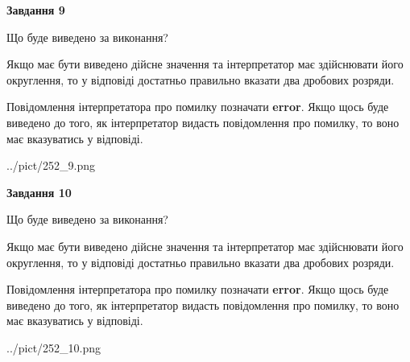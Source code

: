\documentclass[12pt, ukrainian]{article}
\begin{document}
{\begin {Large}
{\begin {center}\textbf{Завдання 9}\end {center}}\par
Що буде виведено за виконання? \par

Якщо має бути виведено дійсне значення та інтерпретатор має здійснювати його округлення, 
то у відповіді достатньо правильно вказати два дробових розряди.

Повідомлення інтерпретатора про помилку позначати \textbf{error}.
Якщо щось буде виведено до того, як інтерпретатор видасть повідомлення про помилку, 
то воно має вказуватись у відповіді. \par

\begin{center}
	{../pict/252_9.png}
\end{center}
\newpage

{\begin {center}\textbf{Завдання 10}\end {center}}\par
Що буде виведено за виконання? \par

Якщо має бути виведено дійсне значення та інтерпретатор має здійснювати його округлення, 
то у відповіді достатньо правильно вказати два дробових розряди.

Повідомлення інтерпретатора про помилку позначати \textbf{error}.
Якщо щось буде виведено до того, як інтерпретатор видасть повідомлення про помилку, 
то воно має вказуватись у відповіді. \par

\begin{center}
	{../pict/252_10.png}
\end{center}
\newpage

\end {Large}}
\end{document}
